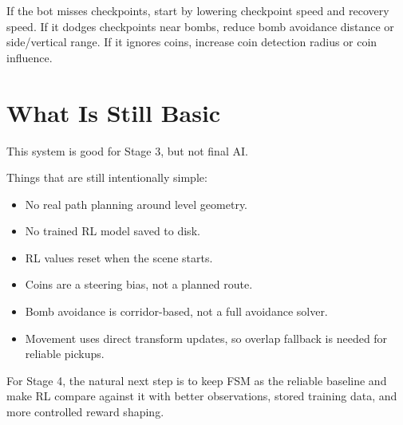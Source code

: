 \documentclass[11pt]{article}
\begin{document}
If the bot misses checkpoints, start by lowering checkpoint speed and recovery speed. If it dodges checkpoints near bombs, reduce bomb avoidance distance or side/vertical range. If it ignores coins, increase coin detection radius or coin influence.

\section{What Is Still Basic}

This system is good for Stage 3, but not final AI.

Things that are still intentionally simple:

\begin{itemize}
    \item No real path planning around level geometry.
    \item No trained RL model saved to disk.
    \item RL values reset when the scene starts.
    \item Coins are a steering bias, not a planned route.
    \item Bomb avoidance is corridor-based, not a full avoidance solver.
    \item Movement uses direct transform updates, so overlap fallback is needed for reliable pickups.
\end{itemize}

For Stage 4, the natural next step is to keep FSM as the reliable baseline and make RL compare against it with better observations, stored training data, and more controlled reward shaping.
\end{document}
